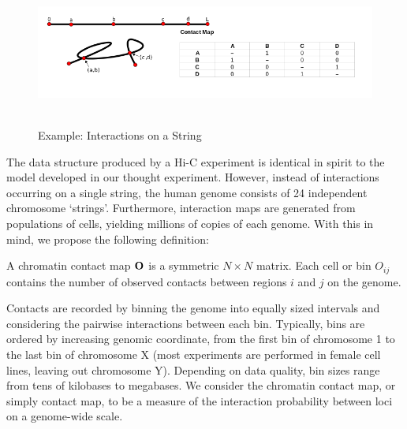 \begin{figure}[H]
  \centering
  \caption[Interactions on a String]{Example: Interactions on a String}\label{fig:string}
  \includegraphics[width=\textwidth]{figures/mathematics/strmtx2}
  \
\end{figure}

The data structure produced by a Hi-C experiment is identical in spirit to the model developed in our thought experiment.  However, instead of
interactions occurring on a single string, the human genome consists of 24 independent chromosome `strings'.  Furthermore, interaction maps are
generated from populations of cells, yielding millions of copies of each genome.  With this in mind, we propose the following definition:

\begin{defn}
  A chromatin contact map $\mathbf{O}$ is a symmetric $N \times N$ matrix.  Each cell or bin $O_{ij}$ contains the number of observed contacts
  between regions $i$ and $j$ on the genome.
\end{defn}

Contacts are recorded by binning the genome into equally sized intervals and considering the pairwise interactions between each bin.
Typically, bins are ordered by increasing genomic coordinate, from the first bin of chromosome 1 to the last bin of chromosome X (most
experiments are performed in female cell lines, leaving out chromosome Y).  Depending on data quality, bin sizes range from tens of
kilobases to megabases.  We consider the chromatin contact map, or simply contact map, to be a measure of the interaction probability between
loci on a genome-wide scale.

